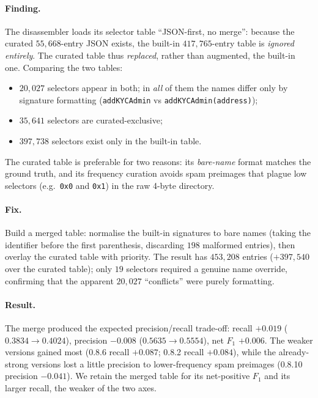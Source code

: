 \documentclass[10pt,conference]{article}
\newcommand{\fbyte}[1]{\texttt{0x#1}}
\begin{document}
\paragraph{Finding.}
The disassembler loads its selector table ``JSON-first, no merge'': because the
curated $55{,}668$-entry JSON exists, the built-in $417{,}765$-entry table is
\emph{ignored entirely}. The curated table thus \emph{replaced}, rather than
augmented, the built-in one. Comparing the two tables:
\begin{itemize}
  \item $20{,}027$ selectors appear in both; in \emph{all} of them the names
        differ only by signature formatting (\texttt{addKYCAdmin} vs
        \texttt{addKYCAdmin(address)});
  \item $35{,}641$ selectors are curated-exclusive;
  \item $397{,}738$ selectors exist only in the built-in table.
\end{itemize}
The curated table is preferable for two reasons: its \emph{bare-name} format
matches the ground truth, and its frequency curation avoids spam preimages that
plague low selectors (e.g.\ \fbyte{0} and \fbyte{1}) in the raw 4-byte directory.

\paragraph{Fix.}
Build a merged table: normalise the built-in signatures to bare names (taking
the identifier before the first parenthesis, discarding $198$ malformed
entries), then overlay the curated table with priority. The result has
$453{,}208$ entries ($+397{,}540$ over the curated table); only $19$ selectors
required a genuine name override, confirming that the apparent $20{,}027$
``conflicts'' were purely formatting.

\paragraph{Result.}
The merge produced the expected precision/recall trade-off: recall
$+0.019$ ($0.3834\rightarrow0.4024$), precision $-0.008$
($0.5635\rightarrow0.5554$), net $F_1$ $+0.006$. The weaker versions gained most
(0.8.6 recall $+0.087$; 0.8.2 recall $+0.084$), while the already-strong versions
lost a little precision to lower-frequency spam preimages (0.8.10 precision
$-0.041$). We retain the merged table for its net-positive $F_1$ and its
larger recall, the weaker of the two axes.
\end{document}
